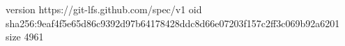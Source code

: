 version https://git-lfs.github.com/spec/v1
oid sha256:9eaf4f5e65d86c9392d97b64178428ddc8d66e07203f157c2ff3c069b92a6201
size 4961
